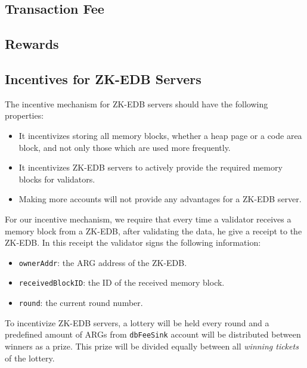 

\subsection{Transaction Fee}\label{subsec:transaction-fee}

\subsection{Rewards}\label{subsec:rewards}


\subsection{Incentives for ZK-EDB Servers}\label{subsec:zk-edb-servers}

The incentive mechanism for ZK-EDB servers should have the following properties:

\begin{itemize}
    \item It incentivizes storing all memory blocks, whether a heap page or a code area block, and not only those
    which are used more frequently.
    \item It incentivizes ZK-EDB servers to actively provide the required memory blocks for validators.
    \item Making more accounts will not provide any advantages for a ZK-EDB server.
\end{itemize}

For our incentive mechanism, we require that every time a validator receives a memory block from a ZK-EDB, after
validating the data, he give a receipt to the ZK-EDB. In this receipt the validator signs the following information:

\begin{itemize}
    \item \texttt{ownerAddr}: the ARG address of the ZK-EDB\@.
    \item \texttt{receivedBlockID}: the ID of the received memory block.
    \item \texttt{round}: the current round number.
\end{itemize}


To incentivize ZK-EDB servers, a lottery will be held every round and a predefined amount of ARGs from
\texttt{dbFeeSink} account will be distributed between winners as a prize. This prize will be divided equally
between all \emph{winning tickets} of the lottery.

